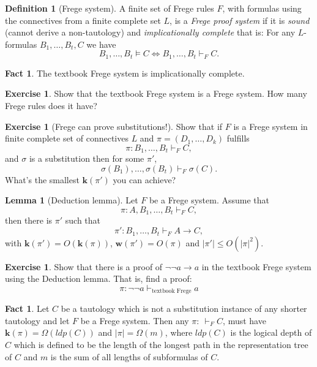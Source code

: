 \documentclass{article}
\theoremstyle{definition}
\newtheorem{excs}[thrm]{Exercise}
\newtheorem{lemm}[thrm]{Lemma}
\newtheorem{fact}[thrm]{Fact}
\newtheorem{defi}[thrm]{Definition}
\newcommand{\abs}[1]{\lvert #1 \rvert}
\newcommand{\w}{\textbf{w}}
\renewcommand{\k}{\textbf{k}}
\begin{document}
\begin{defi}[Frege system]
A finite set of Frege rules $F$, with formulas using the connectives from a finite complete set $L$, is a \emph{Frege proof system} if it is \emph{sound} (cannot derive a non-tautology) and \emph{implicationally complete} that is: For any $L$-formulas $B_1,\dots,B_t,C$ we have
\[B_1,\dots, B_t \models C \iff B_1,\dots, B_t \vdash_F C.\]
\end{defi}

\begin{fact}
    The textbook Frege system is implicationally complete.
\end{fact}

\begin{excs}
    Show that the textbook Frege system is a Frege system. How many Frege rules does it have?    
\end{excs}

\begin{excs}[Frege can prove substitutions!]
    Show that if $F$ is a Frege system in finite complete set of connectives $L$ and $\pi = (D_1,\dots,D_k)$ fulfills \[\pi:B_1,\dots,B_t \vdash_F C,\]
    and $\sigma$ is a substitution then for some $\pi'$,
    \[\sigma(B_1),\dots,\sigma(B_t) \vdash_F \sigma(C).\]
    What's the smallest $\k(\pi')$ you can achieve?
\end{excs}

\begin{lemm}[Deduction lemma]
    Let $F$ be a Frege system. Assume that \[\pi:A,B_1,\dots, B_t \vdash_F C,\] then there is $\pi'$ such that \[\pi': B_1,\dots, B_t \vdash_F A\to C, \] with $\k(\pi')=O(\k(\pi))$, $\w(\pi')=O(\pi)$ and $\abs{\pi'}\leq O(\abs{\pi}^2)$. 
\end{lemm}

\begin{excs}
    Show that there is a proof of $\lnot \lnot a \to a$ in the textbook Frege system using the Deduction lemma. That is, find a proof: \[\pi:\lnot \lnot a \vdash_{\text{textbook Frege}} a\]
\end{excs}

\begin{fact}
    Let $C$ be a tautology which is not a substitution instance of any shorter tautology and let $F$ be a Frege system. Then any $\pi:\: \vdash_F C$, must have $\k(\pi)=\Omega(ldp(C))$ and $\abs{\pi}=\Omega(m)$, where $ldp(C)$ is the logical depth of $C$ which is defined to be the length of the longest path in the representation tree of $C$ and $m$ is the sum of all lengths of subformulas of $C$. 
\end{fact}
\end{document}
